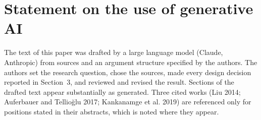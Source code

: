 %
%
%

\section*{Statement on the use of generative AI}

The text of this paper was drafted by a large language model (Claude,
Anthropic) from sources and an argument structure specified by the authors.
The authors set the research question, chose the sources, made every design
decision reported in Section~3, and reviewed and revised the result. Sections
of the drafted text appear substantially as generated. Three cited works
(Liu 2014; Auferbauer and Tellio\u{g}lu 2017; Kankanamge et al. 2019) are
referenced only for positions stated in their abstracts, which is noted where
they appear.

%
